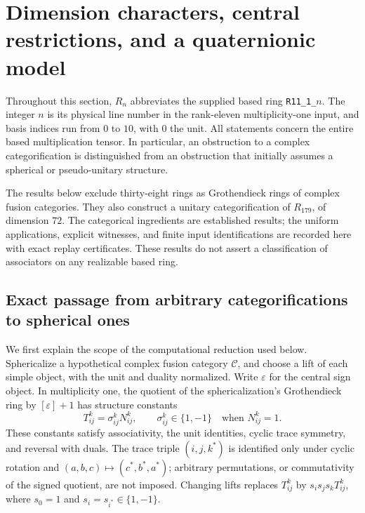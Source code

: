 \documentclass[11pt,a4paper]{article}
\begin{document}
\section{Dimension characters, central restrictions, and a quaternionic model}
\label{sec:r11-nonintegral}

Throughout this section, $R_n$ abbreviates the supplied based ring
\texttt{R11\_1\_}$n$. The integer $n$ is its physical line number in the
rank-eleven multiplicity-one input, and basis indices run from $0$ to $10$,
with $0$ the unit. All statements concern the entire based multiplication
tensor. In particular, an obstruction to a complex categorification is
distinguished from an obstruction that initially assumes a spherical or
pseudo-unitary structure.

The results below exclude thirty-eight rings as Grothendieck rings of
complex fusion categories. They also construct a unitary categorification
of $R_{179}$, of dimension $72$. The categorical ingredients are established
results; the uniform applications, explicit witnesses, and finite input
identifications are recorded here with exact replay certificates. These
results do not assert a classification of associators on any realizable
based ring.

\subsection{Exact passage from arbitrary categorifications to spherical ones}
\label{subsec:r11-signed-bridge}

We first explain the scope of the computational reduction used below.
Sphericalize a hypothetical complex fusion category $\mathcal C$, and
choose a lift of each simple object, with the unit and duality normalized.
Write $\varepsilon$ for the central sign object. In multiplicity one, the
quotient of the sphericalization's Grothendieck ring by
$[\varepsilon]+1$ has structure constants
\[
 T_{ij}^{k}=\sigma_{ij}^{k}N_{ij}^{k},\qquad
 \sigma_{ij}^{k}\in\{1,-1\}
 \quad\text{when }N_{ij}^{k}=1.
\]
These constants satisfy associativity, the unit identities, cyclic trace
symmetry, and reversal with duals. The trace triple $(i,j,k^*)$ is identified
only under cyclic rotation and
$(a,b,c)\mapsto(c^*,b^*,a^*)$; arbitrary permutations, or commutativity of
the signed quotient, are not imposed. Changing lifts replaces
$T_{ij}^{k}$ by $s_i s_j s_k T_{ij}^{k}$, where
$s_0=1$ and $s_i=s_{i^*}\in\{1,-1\}$.
\end{document}
